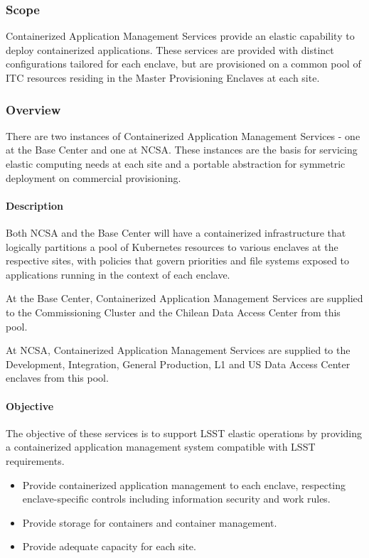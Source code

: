\subsubsection{Scope}

Containerized Application Management Services provide an elastic capability to deploy containerized
applications. These services are provided with distinct configurations tailored for each enclave,
but are provisioned on a common pool of ITC resources residing in the Master Provisioning Enclaves at each site.

\subsubsection{Overview}

There are two instances of Containerized Application Management Services -
one at the Base Center and one at NCSA. These instances are the basis for servicing
elastic computing needs at each site and a portable abstraction for symmetric
deployment on commercial provisioning.

\paragraph{Description}

Both NCSA and the Base Center will have a containerized infrastructure that
logically partitions a pool of Kubernetes resources to various enclaves at the respective
sites, with policies that govern priorities and file systems exposed to
applications running in the context of each enclave.

At the Base Center, Containerized Application Management Services are supplied to the Commissioning
Cluster and the Chilean Data Access Center from this pool.

At NCSA, Containerized Application Management Services are supplied to the Development, Integration,
General Production, L1 and US Data Access Center enclaves from this pool.

\paragraph{Objective}

The objective of these services is to support LSST elastic operations by providing a containerized application
management system compatible with LSST requirements.

\begin{itemize}

\item Provide containerized application management to each enclave, respecting enclave-specific controls including information security and work rules.

\item Provide storage for containers and container management.

\item Provide adequate capacity for each site.

\end{itemize}

